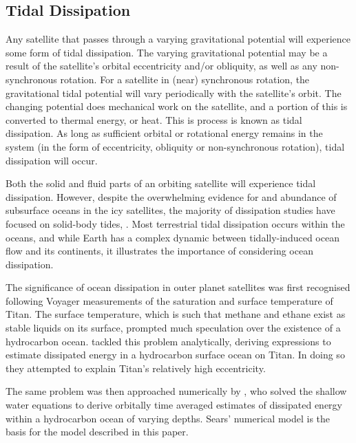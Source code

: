 \subsection{Tidal Dissipation}

Any satellite that passes through a varying gravitational potential will experience some form of tidal dissipation. The varying gravitational potential may be a result of the satellite's orbital eccentricity and/or obliquity, as well as any non-synchronous rotation. For a satellite in (near) synchronous rotation, the gravitational tidal potential will vary periodically with the satellite's orbit. The changing potential does mechanical work on the satellite, and a portion of this is converted to thermal energy, or heat. This is process is known as tidal dissipation. As long as sufficient orbital or rotational energy remains in the system (in the form of eccentricity, obliquity or non-synchronous rotation), tidal dissipation will occur.

Both the solid and fluid parts of an orbiting satellite will experience tidal dissipation. 
However, despite the overwhelming evidence for and abundance of subsurface oceans in the icy satellites, the majority of dissipation studies have focused on solid-body tides, \citep[e.g.,][]{moore2000tidal, tobie2005tidal,roberts2008tidal, beuthe2013spatial}.
Most terrestrial tidal dissipation occurs within the oceans, and while Earth has a complex dynamic between tidally-induced ocean flow and its continents, it illustrates the importance of considering ocean dissipation.

The significance of ocean dissipation in outer planet satellites was first recognised following Voyager measurements of the saturation and surface temperature of Titan. The surface temperature, which is such that methane and ethane exist as stable liquids on its surface, prompted much speculation over the existence of a hydrocarbon ocean. \citet{sagan1982tide} tackled this problem analytically, deriving expressions to estimate dissipated energy in a hydrocarbon surface ocean on Titan. In doing so they attempted to explain Titan's relatively high eccentricity.

The same problem was then approached numerically by \citet{sears1995tidal}, who solved the shallow water equations to derive orbitally time averaged estimates of dissipated energy within a hydrocarbon ocean of varying depths. Sears' numerical model is the basis for the model described in this paper.

